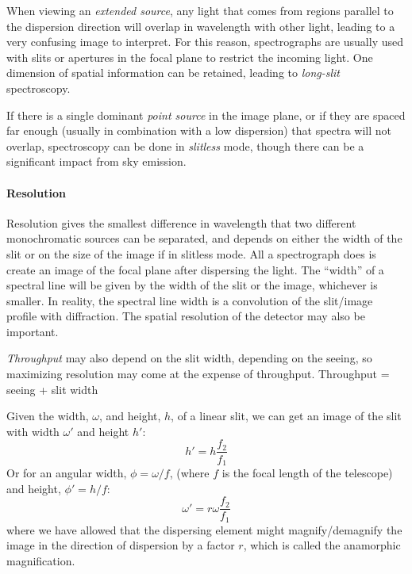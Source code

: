 \documentclass[12pt]{article}
\newcommand{\mynotes}[1]{\textcolor{myBlue}{#1}}
\begin{document}
When viewing an \emph{extended source}, any light that comes from regions parallel to
the dispersion direction will overlap in wavelength with other light, leading
to a very confusing image to interpret. For this reason, spectrographs are
usually used with slits or apertures in the focal plane to restrict the
incoming light. One dimension of spatial information can be retained, leading
to \textit{long-slit} spectroscopy.

If there is a single dominant \emph{point source} in the image plane, or if they are
spaced far enough (usually in combination with a low dispersion) that spectra
will not overlap, spectroscopy can be done in \textit{slitless} mode, though
there can be a significant impact from sky emission.

\paragraph{Resolution}
Resolution gives the smallest difference in wavelength that two different
monochromatic sources can be separated, and depends on either the width of the
slit or on the size of the image if in slitless mode. All a spectrograph does
is create an image of the focal plane after dispersing the light. The ``width''
of a spectral line will be given by the width of the slit or the image,
whichever is smaller. In reality, the spectral line width is a convolution of
the slit/image profile with diffraction. The spatial resolution of the detector
may also be important.

\textit{Throughput} may also depend on the slit width, depending on
the seeing, so maximizing resolution may come at the expense of
throughput. \mynotes{Throughput = seeing + slit width}

Given the width, $\omega$, and height, $h$, of a linear slit, we can get an
image of the slit with width $\omega'$ and height $h'$:
\[
    h' = h\frac{f_{2}}{f_{1}}
    \]
Or for an angular width, $\phi = \omega/f$,
(where $f$ is the focal length of the telescope) and height,
$\phi' = h/f$:
\[
\omega' = r\omega\frac{f_{2}}{f_{1}}
    \]
where we have allowed that the dispersing element might
magnify/demagnify the image in the direction of dispersion by a factor
$r$, which is called the anamorphic magnification.
\end{document}
